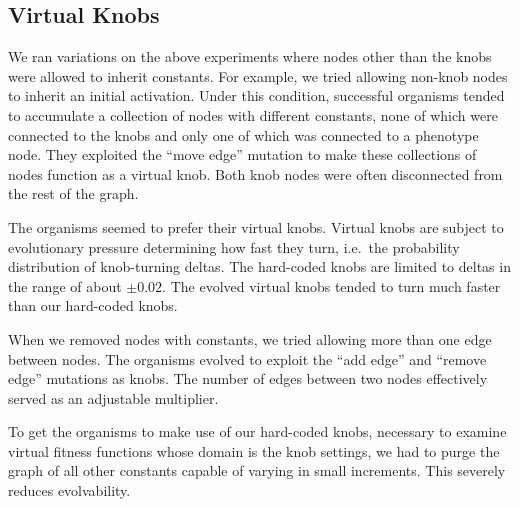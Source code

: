 \documentclass[letterpaper]{article}
\begin{document}

\subsection{Virtual Knobs}

We ran variations on the above experiments where nodes other than the knobs were
allowed to inherit constants. For example, we tried allowing non-knob nodes to
inherit an initial activation. Under this condition, successful organisms tended
to accumulate a collection of nodes with different constants, none of which were
connected to the knobs and only one of which was connected to a phenotype node.
They exploited the ``move edge'' mutation to make these collections of nodes
function as a virtual knob. Both knob nodes were often disconnected from the
rest of the graph.

The organisms seemed to prefer their virtual knobs. Virtual knobs are subject to
evolutionary pressure determining how fast they turn, i.e.~the probability
distribution of knob-turning deltas. The hard-coded knobs are limited to deltas
in the range of about $\pm0.02$. The evolved virtual knobs tended to turn much
faster than our hard-coded knobs.

When we removed nodes with constants, we tried allowing more than one edge
between nodes. The organisms evolved to exploit the ``add edge'' and ``remove
edge'' mutations as knobs. The number of edges between two nodes effectively
served as an adjustable multiplier.

To get the organisms to make use of our hard-coded knobs, necessary to examine
virtual fitness functions whose domain is the knob settings, we had to purge
the graph of all other constants capable of varying in small increments. This
severely reduces evolvability.
\end{document}
